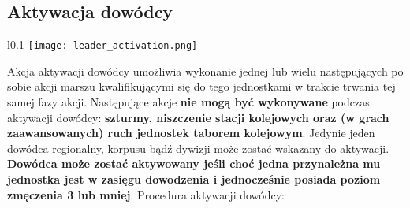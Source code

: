 

\subsection{Aktywacja dowódcy}
\begin{wrapfigure}{l}{0.1\textwidth}
  \texttt{[image: leader\_activation.png]}
\end{wrapfigure}
Akcja aktywacji dowódcy umożliwia wykonanie jednej lub wielu następujących po sobie akcji marszu kwalifikującymi się do tego jednostkami w trakcie trwania tej samej fazy akcji. Następujące akcje \textbf{nie mogą być wykonywane} podczas aktywacji dowódcy: \textbf{szturmy, niszczenie stacji kolejowych oraz (w grach zaawansowanych) ruch jednostek taborem kolejowym}. Jedynie jeden dowódca regionalny, korpusu bądź dywizji może zostać wskazany do aktywacji. \textbf{Dowódca może zostać aktywowany jeśli choć jedna przynależna mu jednostka jest w zasięgu dowodzenia i jednocześnie posiada poziom zmęczenia 3 lub mniej}.
\bigbreak
Procedura aktywacji dowódcy:
